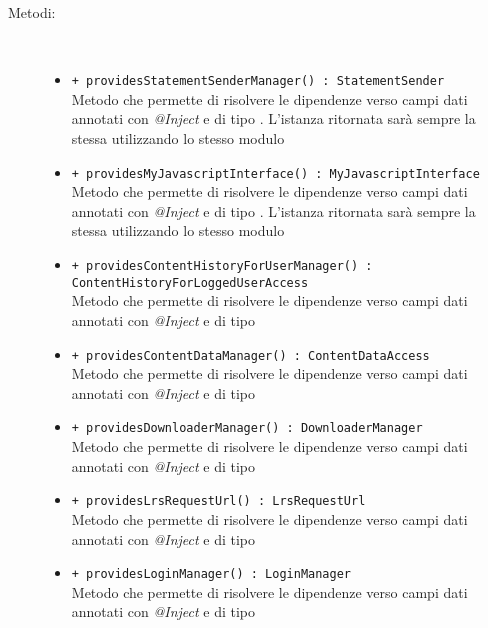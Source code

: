 \documentclass[../Tesi.tex]{subfiles}
\begin{document}
		\begin{description}
			\item[Metodi:] \
			\begin{itemize}
				\item \texttt{+ providesStatementSenderManager() : StatementSender}\\
				Metodo che permette di risolvere le dipendenze verso campi dati annotati con \textit{@Inject} e di tipo . L'istanza ritornata sarà sempre la stessa utilizzando lo stesso modulo
				
				\item \texttt{+ providesMyJavascriptInterface() : MyJavascriptInterface}\\
				Metodo che permette di risolvere le dipendenze verso campi dati annotati con \textit{@Inject} e di tipo . L'istanza ritornata sarà sempre la stessa utilizzando lo stesso modulo

				\item \texttt{+ providesContentHistoryForUserManager() :\\ ContentHistoryForLoggedUserAccess}\\
				Metodo che permette di risolvere le dipendenze verso campi dati annotati con \textit{@Inject} e di tipo 

				\item \texttt{+ providesContentDataManager() : ContentDataAccess}\\
				Metodo che permette di risolvere le dipendenze verso campi dati annotati con \textit{@Inject} e di tipo 

				\item \texttt{+ providesDownloaderManager() : DownloaderManager}\\
				Metodo che permette di risolvere le dipendenze verso campi dati annotati con \textit{@Inject} e di tipo 

				\item \texttt{+ providesLrsRequestUrl() : LrsRequestUrl}\\
				Metodo che permette di risolvere le dipendenze verso campi dati annotati con \textit{@Inject} e di tipo 

				\item \texttt{+ providesLoginManager() : LoginManager}\\
				Metodo che permette di risolvere le dipendenze verso campi dati annotati con \textit{@Inject} e di tipo 


\end{itemize}
\end{description}
\end{document}
